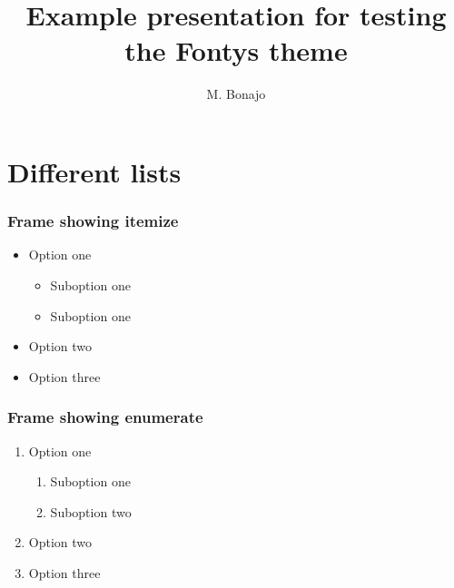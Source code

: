 \documentclass[aspectratio=169]{beamer}
\title{Example presentation for testing the Fontys theme}
\institute{FHTenL}
\author{M. Bonajo}
\begin{document}
\begin{titleframe}
    \titlepage
\end{titleframe}

\begin{frame}
    \tableofcontents
\end{frame}

\section{Different lists}
\begin{frame}
    \frametitle{Frame showing itemize}

    \begin{itemize}
        \item Option one
        \begin{itemize}
            \item Suboption one
            \item Suboption one
        \end{itemize}
        \item Option two
        \item Option three
    \end{itemize}

\end{frame}

\begin{frame}
    \frametitle{Frame showing enumerate}

    \begin{enumerate}
        \item Option one
        \begin{enumerate}
            \item Suboption one
            \item Suboption two
        \end{enumerate}
        \item Option two
        \item Option three
    \end{enumerate}

\end{frame}
\end{document}
